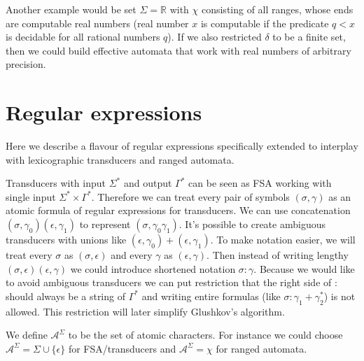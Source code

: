 Another example would be set $\Sigma=\mathbb{R}$ with $\chi$ consisting of all ranges, whose ends are computable real numbers (real number $x$ is computable if the predicate $q<x$ is decidable for all rational numbers $q$). If we also restricted $\delta$ to be a finite set, then we could build effective automata that work with real numbers of arbitrary precision. 



\section{Regular expressions}

Here we describe a flavour of regular expressions specifically extended to interplay with lexicographic transducers and ranged automata. 

Transducers with input $\Sigma^*$ and output $\Gamma^*$ can be seen as FSA working with single input $\Sigma^* \times \Gamma^*$. Therefore we can treat every pair of symbols $(\sigma,\gamma)$ as an atomic formula of regular expressions for transducers. We can use concatenation $(\sigma,\gamma_0)(\epsilon,\gamma_1)$ to represent $(\sigma,\gamma_0\gamma_1)$. It's possible to create ambiguous transducers with unions like  $(\epsilon,\gamma_0)+(\epsilon,\gamma_1)$.  To make notation easier, we will treat every $\sigma$ as $(\sigma,\epsilon)$ and every $\gamma$ as $(\epsilon,\gamma)$. Then instead of writing lengthy $(\sigma,\epsilon)(\epsilon,\gamma)$ we could introduce shortened notation $\sigma:\gamma$. Because we would like to avoid ambiguous transducers we can put restriction that the right side of $:$ should always be a string of $\Gamma^*$ and writing entire formulas (like $\sigma:\gamma_1+\gamma_2^*$) is not allowed. This restriction will later simplify Glushkov's algorithm. 

We define $\mathcal{A}^\Sigma$ to be the set of atomic characters. For instance we could choose $\mathcal{A}^\Sigma=\Sigma\cup\{\epsilon\}$ for FSA/transducers and $\mathcal{A}^\Sigma=\chi$ for ranged automata. 


